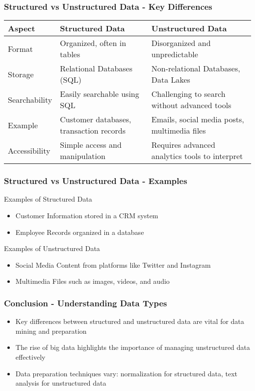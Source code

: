 \documentclass{beamer}
\begin{document}
\begin{frame}[fragile]
    \frametitle{Structured vs Unstructured Data - Key Differences}
    \begin{tabular}{|l|l|l|}
        \hline
        \textbf{Aspect} & \textbf{Structured Data} & \textbf{Unstructured Data} \\
        \hline
        Format & Organized, often in tables & Disorganized and unpredictable \\
        \hline
        Storage & Relational Databases (SQL) & Non-relational Databases, Data Lakes \\
        \hline
        Searchability & Easily searchable using SQL & Challenging to search without advanced tools \\
        \hline
        Example & Customer databases, transaction records & Emails, social media posts, multimedia files \\
        \hline
        Accessibility & Simple access and manipulation & Requires advanced analytics tools to interpret \\
        \hline
    \end{tabular}
\end{frame}

\begin{frame}[fragile]
    \frametitle{Structured vs Unstructured Data - Examples}
    \begin{block}{Examples of Structured Data}
        \begin{itemize}
            \item Customer Information stored in a CRM system
            \item Employee Records organized in a database
        \end{itemize}
    \end{block}

    \begin{block}{Examples of Unstructured Data}
        \begin{itemize}
            \item Social Media Content from platforms like Twitter and Instagram
            \item Multimedia Files such as images, videos, and audio
        \end{itemize}
    \end{block}
\end{frame}

\begin{frame}[fragile]
    \frametitle{Conclusion - Understanding Data Types}
    \begin{itemize}
        \item Key differences between structured and unstructured data are vital for data mining and preparation
        \item The rise of big data highlights the importance of managing unstructured data effectively
        \item Data preparation techniques vary: normalization for structured data, text analysis for unstructured data
    \end{itemize}
\end{frame}
\end{document}
